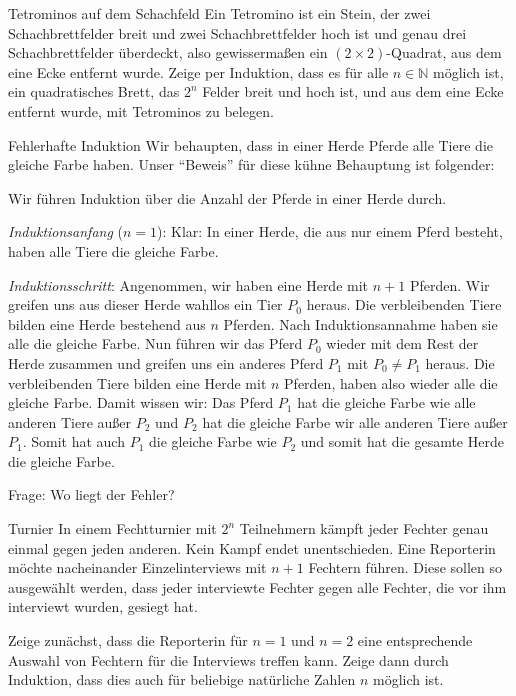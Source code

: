 \documentclass{uebungszettel}
\newcommand{\N}{\mathbb{N}} %
\begin{document}
\newpage

\begin{aufgabe}{Tetrominos auf dem Schachfeld}
  Ein Tetromino ist ein Stein, der zwei Schachbrettfelder breit und zwei Schachbrettfelder hoch ist und genau drei Schachbrettfelder überdeckt, also gewissermaßen ein $(2 \times 2)$-Quadrat, aus dem eine Ecke entfernt wurde. Zeige per Induktion, dass es für alle $n \in \N$ möglich ist, ein quadratisches Brett, das $2^n$ Felder breit und hoch ist, und aus dem eine Ecke entfernt wurde, mit Tetrominos zu belegen.
\end{aufgabe}

\begin{aufgabe}{Fehlerhafte Induktion}
  Wir behaupten, dass in einer Herde Pferde alle Tiere die gleiche Farbe haben. Unser "`Beweis"' für diese kühne Behauptung ist folgender:

  Wir führen Induktion über die Anzahl der Pferde in einer Herde durch.

  \emph{Induktionsanfang} ($n=1$): Klar: In einer Herde, die aus nur einem Pferd besteht, haben alle Tiere die gleiche Farbe.

  \emph{Induktionsschritt}: Angenommen, wir haben eine Herde mit $n+1$ Pferden. Wir greifen uns aus dieser Herde wahllos ein Tier $P_0$ heraus. Die verbleibenden Tiere bilden eine Herde bestehend aus $n$ Pferden. Nach Induktionsannahme haben sie alle die gleiche Farbe. Nun führen wir das Pferd $P_0$ wieder mit dem Rest der Herde zusammen und greifen uns ein anderes Pferd $P_1$ mit $P_0 \not= P_1$ heraus. Die verbleibenden Tiere bilden eine Herde mit $n$ Pferden, haben also wieder alle die gleiche Farbe. Damit wissen wir: Das Pferd $P_1$ hat die gleiche Farbe wie alle anderen Tiere außer $P_2$ und $P_2$ hat die gleiche Farbe wir alle anderen Tiere außer $P_1$. Somit hat auch $P_1$ die gleiche Farbe wie $P_2$ und somit hat die gesamte Herde die gleiche Farbe.

  Frage: Wo liegt der Fehler?
\end{aufgabe}


\begin{aufgabe}{Turnier}
  In einem Fechtturnier mit $2^n$ Teilnehmern kämpft jeder Fechter genau einmal gegen jeden anderen. Kein Kampf endet unentschieden. Eine Reporterin möchte nacheinander Einzelinterviews mit $n+1$ Fechtern führen. Diese sollen so ausgewählt werden, dass jeder interviewte Fechter gegen alle Fechter, die vor ihm interviewt wurden, gesiegt hat.

  Zeige zunächst, dass die Reporterin für $n=1$ und $n=2$ eine entsprechende Auswahl von Fechtern für die Interviews treffen kann. Zeige dann durch Induktion, dass dies auch für beliebige natürliche Zahlen $n$ möglich ist.
\end{aufgabe}
\end{document}

